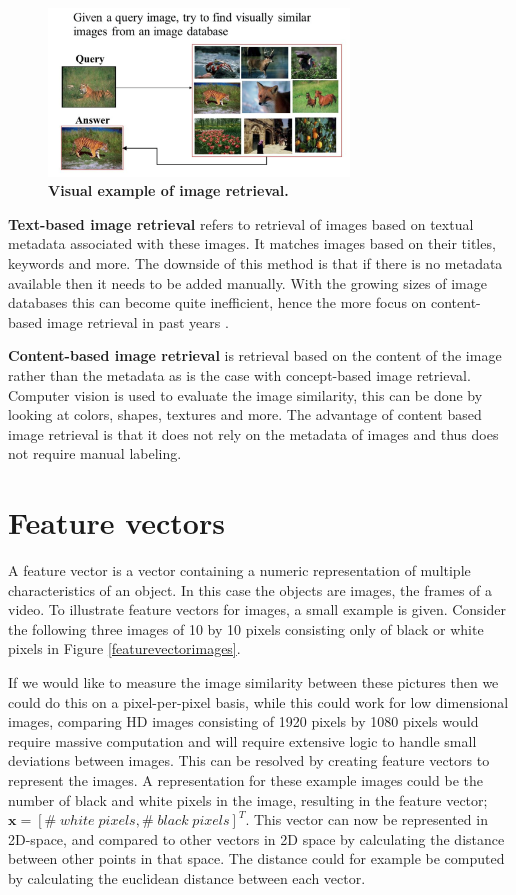 \documentclass{report}
\begin{document}
\begin{figure}[H]
	\includegraphics[width=8cm]{images/imageretrieval.png}
	\centering
	\caption{\textbf{Visual example of image retrieval.}}
	\label{fig:imageretrieval}
\end{figure}

\textbf{Text-based image retrieval} refers to retrieval of images based on textual metadata associated with these images. It matches images based on their titles, keywords and more. The downside of this method is that if there is no metadata available then it needs to be added manually. With the growing sizes of image databases this can become quite inefficient, hence the more focus on content-based image retrieval in past years \cite{rajam2013survey}.

\textbf{Content-based image retrieval} is retrieval based on the content of the image rather than the metadata as is the case with concept-based image retrieval. Computer vision is used to evaluate the image similarity, this can be done by looking at colors, shapes, textures and more. The advantage of content based image retrieval is that it does not rely on the metadata of images and thus does not require manual labeling.

\section{Feature vectors}
A feature vector is a vector containing a numeric representation of multiple characteristics of an object. In this case the objects are images, the frames of a video. To illustrate feature vectors for images, a small example is given. Consider the following three images of 10 by 10 pixels consisting only of black or white pixels in Figure \ref{featurevectorimages}.

If we would like to measure the image similarity between these pictures then we could do this on a pixel-per-pixel basis, while this could work for low dimensional images, comparing HD images consisting of 1920 pixels by 1080 pixels would require massive computation and will require extensive logic to handle small deviations between images. This can be resolved by creating feature vectors to represent the images. A representation for these example images could be the number of black and white pixels in the image, resulting in the feature vector; $\textbf{x} = [\#\;white\;pixels, \#\;black\;pixels]^T$. This vector can now be represented in 2D-space, and compared to other vectors in 2D space by calculating the distance between other points in that space. The distance could for example be computed by calculating the euclidean distance between each vector.
\end{document}
